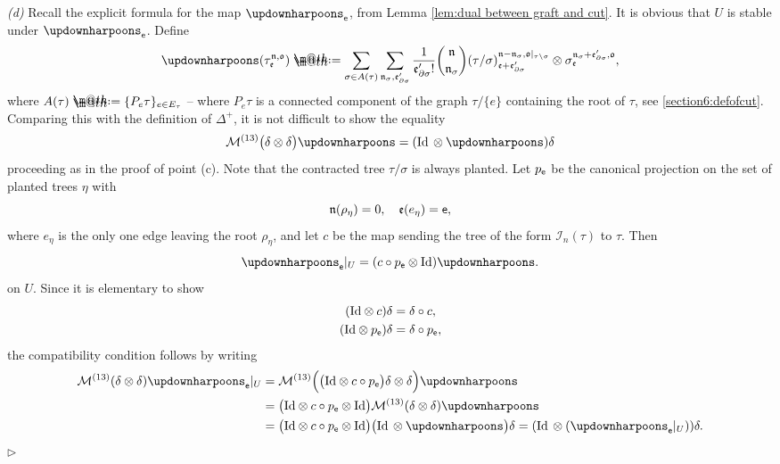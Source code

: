 \documentclass[10pt, reqno]{amsart}
\makeatletter
\numberwithin{subsection}{section}
\numberwithin{subsubsection}{subsection}
\numberwithin{equation}{section} %
\newenvironment{Dem}[1][\unskip]{%
    \begin{list}{\hspace{1.15cm}{\sf \textbf{{\small Proof #1 --}}}}{%
        \setlength{\topsep}{0pt}%
        \setlength{\leftmargin}{0pt}%
        \setlength{\rightmargin}{0pt}%
        \setlength{\listparindent}{0pt}%
        \setlength{\itemindent}{0pt}%
        \setlength{\parsep}{0pt}%
        \addtolength{\leftmargin}{0pt}%
        \addtolength{\rightmargin}{0pt}%
    } \item }{\hfill $\rhd$\end{list}\smallskip}
\theoremstyle{mystyle}
\theoremstyle{mystyle2}
\theoremstyle{mystyle3}
\newcommand{\mcI}{\mathcal{I}}
\newcommand{\mcM}{\mathcal{M}}
\newcommand*{\defeq}{\mathrel{\rlap{%
                     \raisebox{0.3ex}{$\m@th\cdot$}}%
                     \raisebox{-0.3ex}{$\m@th\cdot$}}%
                     =}
\makeatother
\begin{document}
\begin{Dem}
\textit{\textsf{(d)}}
Recall the explicit formula for the map $\updownharpoons_{\sf e}$, from Lemma \ref{lem:dual between graft and cut}. It is obvious that $U$ is stable under $\updownharpoons_{\sf e}$. Define
$$
\updownharpoons(\tau_{\frak{e}}^{\frak{n},\frak{o}})
\defeq  \sum_{\sigma\in A(\tau)}\sum_{\frak{n}_\sigma,\frak{e}_{\partial \sigma}'}
\frac1{\frak{e}_{\partial\sigma}'!}\binom{\frak{n}}{\frak{n}_\sigma}
(\tau/\sigma)_{\frak{e}+\frak{e}_{\partial\sigma}'}^{\frak{n}-\frak{n}_\sigma,\frak{o}\vert_{\tau\setminus\sigma}}
\otimes \sigma_{\frak{e}}^{\frak{n}_\sigma+\frak{e}_{\partial\sigma}',\frak{o}},
$$
where $A(\tau)\defeq \{P_e\tau\}_{e\in E_\tau}$ -- where $P_e\tau$ is a connected component of the graph $\tau/\{e\}$ containing the root of $\tau$, see \eqref{section6:defofcut}. Comparing this with the definition of $\Delta^+$,  it is not difficult to show the equality
$$
\mcM^{(13)}\big(\delta\otimes\delta\big)\updownharpoons
= (\text{\rm Id} \,\otimes \updownharpoons)\delta
$$
proceeding as in the proof of point {\sf (c)}. Note that the contracted tree $\tau/\sigma$ is always planted. Let $p_{\sf e}$ be the canonical projection on the set of planted trees $\eta$ with
$$
\frak{n}(\rho_\eta)=0,\quad \frak{e}(e_\eta)={\sf e},
$$
where $e_\eta$ is the only one edge leaving the root $\rho_\eta$, and let 
$c$ be the map sending the tree of the form $\mcI_n(\tau)$ to $\tau$. Then
$$
{\updownharpoons_{\sf e}}\vert_U=
(c\circ p_{\sf e}\otimes\text{\rm Id})\updownharpoons.
$$
on $U$. Since it is elementary to show
\begin{equation*}  \begin{split}
(\textrm{Id}\otimes c)\delta &= \delta\circ c,   \\
(\textrm{Id}\otimes p_{\sf e})\delta &=\delta\circ p_{\sf e},
\end{split}  \end{equation*}
the compatibility condition follows by writing
\begin{align*}
\mcM^{(13)}(\delta\otimes\delta){\updownharpoons_{\sf e}}\vert_U
&= \mcM^{(13)}\Big(\big(\text{\rm Id}\otimes c\circ p_{\sf e}\big)\delta\otimes\delta\Big)\updownharpoons\\
&= \big(\text{\rm Id}\otimes c\circ p_{\sf e}\otimes\text{\rm Id}\big) \mcM^{(13)}(\delta\otimes\delta)\updownharpoons\\
&= \big(\text{\rm Id}\otimes c\circ p_{\sf e}\otimes\text{\rm Id}\big) \big(\text{\rm Id}\,\otimes\updownharpoons\big)\delta = (\text{\rm Id}\,\otimes ({\updownharpoons_{\sf e}}\vert_U))\delta.
\end{align*}
\end{Dem}
\end{document}
